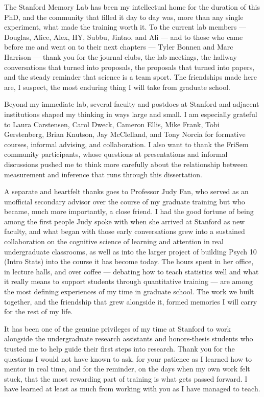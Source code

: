 The Stanford Memory Lab has been my intellectual home for the duration of this PhD, and the community that filled it day to day was, more than any single experiment, what made the training worth it. To the current lab members --- Douglas, Alice, Alex, HY, Subbu, Jintao, and Ali  --- and to those who came before me and went on to their next chapters --- Tyler Bonnen and Marc Harrison --- thank you for the journal clubs, the lab meetings, the hallway conversations that turned into proposals, the proposals that turned into papers, and the steady reminder that science is a team sport. The friendships made here are, I suspect, the most enduring thing I will take from graduate school.

Beyond my immediate lab, several faculty and postdocs at Stanford and adjacent institutions shaped my thinking in ways large and small. I am especially grateful to Laura Carstensen, Carol Dweck, Cameron Ellis, Mike Frank, Tobi Gerstenberg, Brian Knutson, Jay McClelland, and Tony Norcia for formative courses, informal advising, and collaboration. I also want to thank the FriSem community participants, whose questions at presentations and informal discussions pushed me to think more carefully about the relationship between measurement and inference that runs through this dissertation.

A separate and heartfelt thanks goes to Professor Judy Fan, who served as an unofficial secondary advisor over the course of my graduate training but who became, much more importantly, a close friend. I had the good fortune of being among the first people Judy spoke with when she arrived at Stanford as new faculty, and what began with those early conversations grew into a sustained collaboration on the cognitive science of learning and attention in real undergraduate classrooms, as well as into the larger project of building Psych 10 (Intro Stats) into the course it has become today. The hours spent in her office, in lecture halls, and over coffee --- debating how to teach statistics well and what it really means to support students through quantitative training --- are among the most defining experiences of my time in graduate school. The work we built together, and the friendship that grew alongside it, formed memories I will carry for the rest of my life.

It has been one of the genuine privileges of my time at Stanford to work alongside the undergraduate research assistants and honors-thesis students who trusted me to help guide their first steps into research. Thank you for the questions I would not have known to ask, for your patience as I learned how to mentor in real time, and for the reminder, on the days when my own work felt stuck, that the most rewarding part of training is what gets passed forward. I have learned at least as much from working with you as I have managed to teach.

